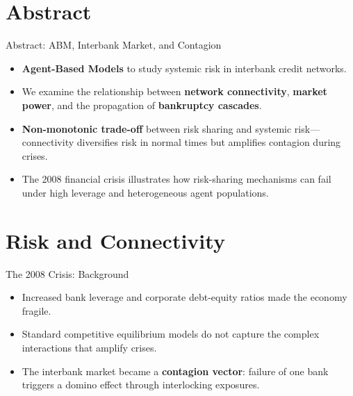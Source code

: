 \section{Abstract}\label{sec:1}

\begin{frame}{Abstract: ABM, Interbank Market, and Contagion}
  \begin{itemize}
    \item \textbf{Agent-Based Models} to study systemic risk in interbank credit networks.
    \item We examine the relationship between \textbf{network connectivity}, \textbf{market power}, and the propagation of \textbf{bankruptcy cascades}.    
    \item \textbf{Non-monotonic trade-off} between risk sharing and systemic risk---connectivity diversifies risk in normal times but amplifies contagion during crises.
    \item The 2008 financial crisis illustrates how risk-sharing mechanisms can fail under high leverage and heterogeneous agent populations.
  \end{itemize}
\end{frame}

\section{Risk and Connectivity}\label{sec:2}

\begin{frame}{The 2008 Crisis: Background}
  \begin{itemize}
    \item Increased bank leverage and corporate debt-equity ratios made the economy fragile.
    \item Standard competitive equilibrium models do not capture the complex interactions that amplify crises.
    \item The interbank market became a \textbf{contagion vector}: failure of one bank triggers a domino effect through interlocking exposures.
  \end{itemize}
\end{frame}

